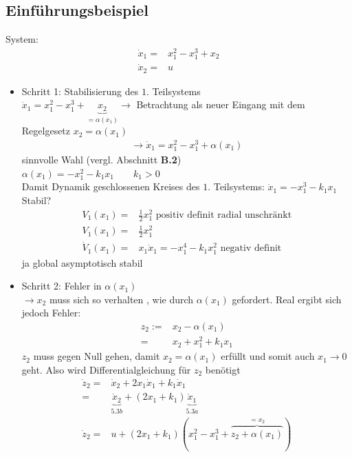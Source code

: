 \documentclass[11pt,a4paper]{article}
\begin{document}
\subsection{Einführungsbeispiel}
System: \begin{align}\dot x_1 =& x_1^2 - x_1^3 + x_2 \tag{5.3a}\\
\dot x_2 = & u \tag{5.3b}
\end{align}
\begin{itemize}
\item Schritt 1: Stabilisierung des $1.$ Teilsystems\\
$\dot x_1 = x_1^2 - x_1^3 + \underbrace{x_2}_{ = \alpha(x_1)} \rightarrow$ Betrachtung als neuer Eingang mit dem Regelgesetz $x_2 = \alpha(x_1)$
\begin{align}
\rightarrow \dot x_1 = x_1^2 - x_1^3 + \alpha(x_1) \tag{5.4}
\end{align}
sinnvolle Wahl (vergl. Abschnitt \textbf{B.2})\\
$\alpha(x_1) = -x_1^2 - k_1x_1 \qquad k_1 > 0$\\
Damit Dynamik  geschlossenen Kreises des $1.$ Teilsystems: $\dot x_1 = -x_1^3 - k_1x_1$\\
Stabil? \begin{align*}V_1(x_1) =& \frac{1}{2} x_1^2 \text{ positiv definit radial unschränkt}\\
V_1(x_1) = & \frac{1}{2} x_1^2 \\
\dot V_1(x_1) =& x_1\dot x_1 = -x_1^4 - k_1 x_1^2 \text{ negativ definit } 
\end{align*}
ja global asymptotisch stabil
\item Schritt 2: Fehler in $\alpha(x_1)$\\
$\rightarrow x_2$ muss sich so verhalten , wie durch $\alpha(x_1)$ gefordert. Real ergibt sich jedoch Fehler: \begin{align*}z_2:= &x_2 - \alpha(x_1)\\
=& x_2 + x_1^2 + k_1 x_1
\end{align*} 
$z_2 $ muss gegen Null gehen, damit $x_2 = \alpha(x_1)$ erfüllt und somit auch $x_1 \to 0$ geht. Also wird Differentialgleichung für $z_2$ benötigt 
\begin{align*}
\dot z_2 = &\dot x_2 + 2x_1 \dot x_1 + k_1 \dot x_1\\
=&\underbrace{\dot x_2}_{5.3b} + (2 x_1 + k_1) \underbrace{\dot x_1}_{5.3a}\\
\dot z_2 = & u + (2x_1 + k_1)(x_1^2 - x_1^3 + \overbrace{z_2 + \alpha(x_1)}^{= x_2}) \\

\end{align*}
\end{itemize}
\end{document}
